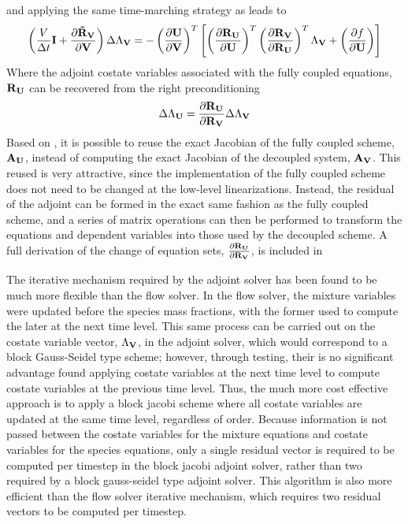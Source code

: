 and applying the same time-marching strategy as  leads to
\begin{equation}
  \left(
    \frac{V}{\Delta t} \mathbf I + \frac{\partial \mathbf{\tilde{R}_{\mathbf V}}}{\partial \mathbf V}
  \right) \Delta \Lambda_{\mathbf V}
  = -
  \left( \frac{\partial \mathbf U}{\partial \mathbf V} \right)^{T}
  \left[
    \left(\frac{\partial \mathbf R_{{\mathbf U}_{}}}{\partial \mathbf U} \right)^{T} 
    \left( \frac{\partial \mathbf R_{{\mathbf V}_{}}}{\partial \mathbf R_{{\mathbf U}_{}}} \right)^{T}
    \Lambda_{\mathbf V} 
    + \left( \frac{\partial f}{\partial \mathbf U} \right)
  \right]
  \label{adj-u-to-v-time}
\end{equation}
Where the adjoint costate variables associated with the fully coupled equations,
$\mathbf R_{{\mathbf U}_{}}$ can be recovered from the right preconditioning
\begin{equation}
  \Delta \Lambda_{\mathbf U} = \frac{\partial \mathbf R_{{\mathbf U}_{}}}{\partial \mathbf R_{{\mathbf V}_{}}} \Delta \Lambda_{\mathbf V}
  \label{adj-lam-v-to-u}
\end{equation}
Based on , it is possible to reuse the
exact Jacobian of the fully coupled scheme, $\mathbf A_{\mathbf U}$, instead of computing
the exact Jacobian of the decoupled system, $\mathbf A_{\mathbf V}$.  This reused is very
attractive, since the implementation of the fully coupled scheme does not need
to be changed at the low-level linearizations.  Instead, the residual of the
adjoint can be formed in the exact same fashion as the fully coupled scheme, and
a series of matrix operations can then be performed to transform the equations
and dependent variables into those used by the decoupled scheme. A full
derivation of the change of equation sets, $\frac{\partial \mathbf R_{{\mathbf U}_{}}}{\partial \mathbf R_{{\mathbf V}_{}}}$, is included
in 

The iterative mechanism required by the adjoint solver has been found to be much
more flexible than the flow solver.  In the flow solver, the mixture variables
were updated before the species mass fractions, with the former used to compute
the later at the next time level.  This same process can be carried out on the
costate variable vector, $\Lambda_{\mathbf V}$, in the adjoint solver, which would
correspond to a block Gauss-Seidel type scheme; however, through testing, their
is no significant advantage found applying costate variables at the next time
level to compute costate variables at the previous time level.  Thus, the much
more cost effective approach is to apply a block jacobi scheme where all
costate variables are updated at the same time level, regardless of order.
Because information is not passed between the costate variables for the mixture
equations and costate variables for the species equations, only a single
residual vector is required to be computed per timestep in the block jacobi
adjoint solver, rather than two required by a block gauss-seidel type adjoint
solver.  This algorithm is also more efficient than the flow solver iterative
mechanism, which requires two residual vectors to be computed per timestep.


